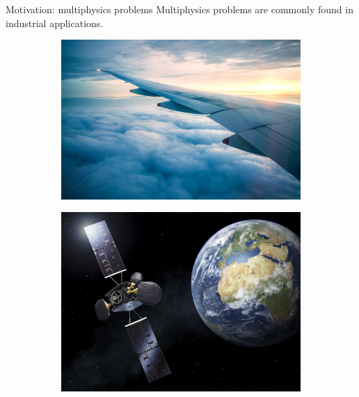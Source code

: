 \documentclass[aspectratio=169]{beamer}
\begin{document}
\begin{frame}{Motivation: multiphysics problems}
		Multiphysics problems are commonly found in industrial applications.
		\begin{figure}[t]
			\begin{subfigure}[t]{0.34\textwidth}
				\includegraphics[width=\columnwidth]{wing.jpg}\\
			\end{subfigure}\hfill
			\begin{subfigure}[t]{0.3\textwidth}
				\includegraphics[width=\columnwidth]{esa_satellite.jpg}\\
			\end{subfigure}\hfill
			\begin{subfigure}[t]{0.26\textwidth}

\end{subfigure}
\end{figure}
\end{frame}
\end{document}
